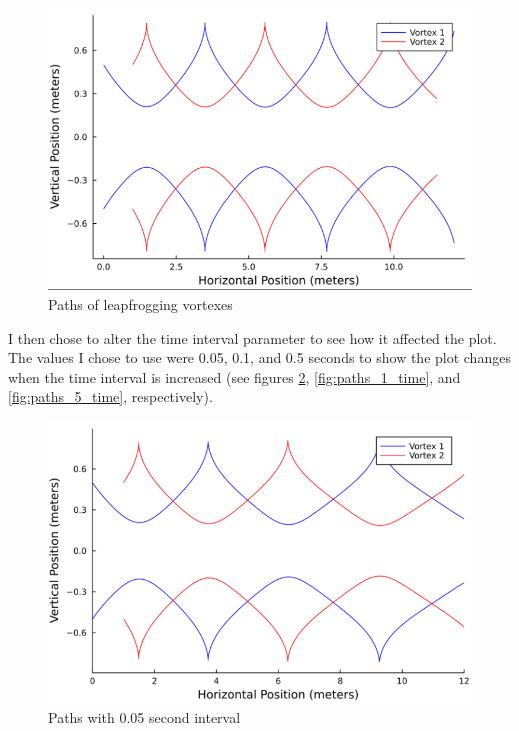 \documentclass{article}
\begin{document}
\begin{figure}[ht]
\centering
\includegraphics[scale=0.75]{graphics/plots_1.1.4000.01.png}
\caption{Paths of leapfrogging vortexes}
\label{fig:paths_01_time}
\end{figure}

I then chose to alter the time interval parameter to see how it affected the plot. The values I chose to use were 0.05, 0.1, and 0.5 seconds to show the plot changes when the time interval is increased (see figures \ref{fig:paths_05_time}, \ref{fig:paths_1_time}, and \ref{fig:paths_5_time}, respectively).

\begin{figure}[ht]
\centering
\includegraphics[scale=.75]{graphics/plots_1.1.4000.05.png}
\caption{Paths with 0.05 second interval}
\label{fig:paths_05_time}
\end{figure}
\end{document}
